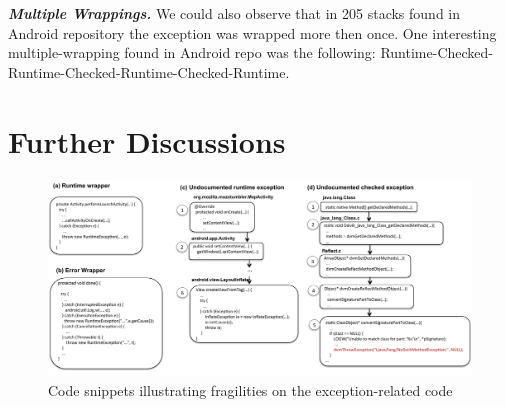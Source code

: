 \documentclass[conference]{IEEEtran}
\begin{document}


\emph{\textbf{Multiple Wrappings.}} We could also observe that in 205 stacks found
 in Android repository the exception was wrapped  more then once. One interesting 
multiple-wrapping found in Android repo was the 
following: Runtime-Checked-Runtime-Checked-Runtime-Checked-Runtime.

\noindent {}


\section{Further Discussions}
\label{sec:disc}

\begin{figure} \centering \includegraphics[scale=0.55]{codeexamples.pdf}
\caption{Code snippets illustrating fragilities on the exception-related code} \label{fig:snippets} \end{figure}
\end{document}
